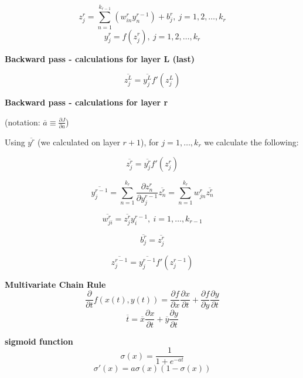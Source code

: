 \documentclass{article}
\begin{document}
\begin{multicols}{2}
\[z_j^r = \sum_{n=1}^{k_{r-1}} \left( w_{in}^r y_n^{r-1} \right) + b_j^r,\ j=1, 2, \ldots, k_r\]
\[y_j^r = f(z_j^r),\ j=1, 2, \ldots, k_r\]

\textbf{Backward pass - calculations for layer L (last)}

\[\overline{z_j^L} = \overline{y_j^L} f'(z_j^L)\]

\textbf{Backward pass - calculations for layer r}

(notation: $\overline{a} \equiv \frac{\partial J}{\partial a}$)

Using $\overline{y^r}$ (we calculated on layer $r+1$), for $j=1, \ldots, k_r$ we calculate the following:

\[\overline{z_j^r} = \overline{y_j^r} f'(z_j^r)\]

\[\overline{y_j^{r-1}} = \sum_{n=1}^{k_{r}} \frac{\partial z_n^r}{\partial y_j^{r-1}} \overline{z_n^r} = \sum_{n=1}^{k_{r}} w_{jn}^r \overline{z_n^r}\]

\[\overline{w_{ji}^r} = \overline{z_j^r} y_i^{r-1},\ i=1, \ldots, k_{r-1}\]

\[\overline{b_j^r} = \overline{z_j^r}\]

\[\overline{z_j^{r-1}} = \overline{y_j^{r-1}} f'(z_j^{r-1})\]

\textbf{Multivariate Chain Rule}
\[\frac{\partial}{\partial t} f(x(t), y(t)) = \frac{\partial f}{\partial x} \frac{\partial x}{\partial t} + \frac{\partial f}{\partial y} \frac{\partial y}{\partial t}\]
\[\overline{t} = \overline{x} \frac{\partial x}{\partial t} + \overline{y} \frac{\partial y}{\partial t}\]

\textbf{sigmoid function}
\[\sigma(x) = \frac{1}{1+e^{-at}}\]
\[\sigma'(x) = a \sigma(x) (1-\sigma(x))\]


\end{multicols}
\end{document}
